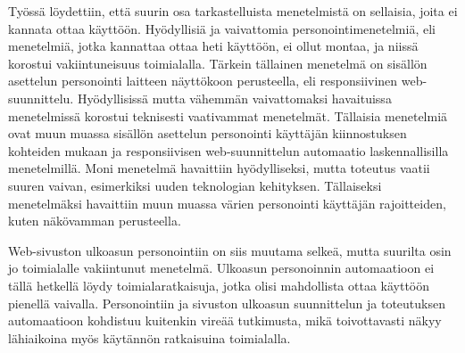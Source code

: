 \documentclass[finnish, 12pt, a4paper, elec, utf8, a-1b, online]{aaltothesis}
\begin{document}
Työssä löydettiin, että suurin osa tarkastelluista menetelmistä on sellaisia,
joita ei kannata ottaa käyttöön. Hyödyllisiä ja vaivattomia
personointimenetelmiä, eli menetelmiä, jotka kannattaa ottaa heti käyttöön, ei
ollut montaa, ja niissä korostui vakiintuneisuus toimialalla. Tärkein tällainen
menetelmä on sisällön asettelun personointi laitteen näyttökoon perusteella, eli
responsiivinen web-suunnittelu. Hyödyllisissä mutta vähemmän vaivattomaksi
havaituissa menetelmissä korostui teknisesti vaativammat menetelmät. Tällaisia
menetelmiä ovat muun muassa sisällön asettelun personointi käyttäjän
kiinnostuksen kohteiden mukaan ja responsiivisen web-suunnittelun automaatio
laskennallisilla menetelmillä. Moni menetelmä havaittiin hyödylliseksi, mutta
toteutus vaatii suuren vaivan, esimerkiksi uuden teknologian kehityksen.
Tällaiseksi menetelmäksi havaittiin muun muassa värien personointi käyttäjän
rajoitteiden, kuten näkövamman perusteella.

Web-sivuston ulkoasun personointiin on siis muutama selkeä, mutta suurilta osin
jo toimialalle vakiintunut menetelmä. Ulkoasun personoinnin automaatioon ei
tällä hetkellä löydy toimialaratkaisuja, jotka olisi mahdollista ottaa käyttöön
pienellä vaivalla. Personointiin ja sivuston ulkoasun suunnittelun ja
toteutuksen automaatioon kohdistuu kuitenkin vireää tutkimusta, mikä
toivottavasti näkyy lähiaikoina myös käytännön ratkaisuina toimialalla.

\clearpage

\thesisbibliography{}
\printbibliography{}
\end{document}
